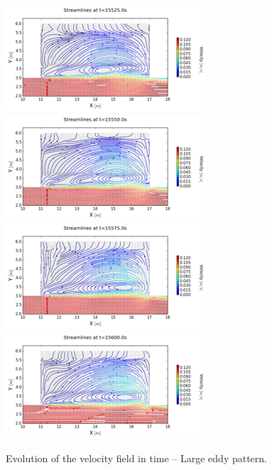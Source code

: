 \begin{figure}
 \centering
\includegraphics{img/image145}
\includegraphics{img/image146}
\includegraphics{img/image147}
\includegraphics{img/image148}
 \caption{Evolution of the velocity field in time -- Large eddy pattern.}\label{fig:cavity:evol_large}
\end{figure}
